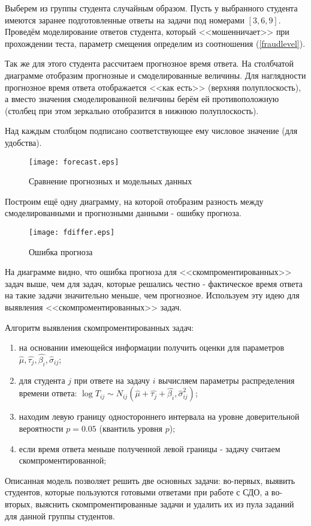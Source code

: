 Выберем из группы студента случайным образом. Пусть у выбранного студента имеются заранее подготовленные ответы на задачи под номерами $[3,6,9]$. Проведём моделирование ответов студента, который <<мошенничает>> при прохождении теста, параметр смещения определим из соотношения (\ref{fraudlevel}).

Так же для этого студента рассчитаем прогнозное время ответа. На стол\-бчатой диаграмме отобразим прогнозные и смоделированные величины. Для наглядности прогнозное время ответа отображается <<как есть>> (верхняя по\-луплоскость), а вместо значения смоделированной величины берём ей про\-тивоположную (столбец при этом зеркально отобразится в нижнюю полуплос\-кость). 

\newpage
Над каж\-дым столбцом подписано соответствующее ему чи\-словое зна\-чение (для удобства).

\begin{figure}[ht!]
\centering \texttt{[image: forecast.eps]}
\caption{Сравнение прогнозных и модельных данных}
\end{figure}

\newpage
Построим ещё одну диаграмму, на которой отобразим разность между смоделированными и прогнозными данными - ошибку прогноза.

\begin{figure}[ht!]
\centering \texttt{[image: fdiffer.eps]}
\caption{Ошибка прогноза}
\end{figure}
На диаграмме видно, что ошибка прогноза для <<скомпроментированных>> задач выше, чем для задач, которые решались честно - фактическое время ответа на такие задачи значительно меньше, чем прогнозное. Используем эту идею для выяв\-ления <<скомпроментированных>> задач.

Алгоритм выявления скомпроментированных задач:
\begin{enumerate}
\item на основании имеющейся информации получить оценки для параметров $\hat{\mu}, \hat{\tau_j}, \hat{\beta_i}, \hat{\sigma}_{ij}$;
\item для студента $j$ при ответе на задачу $i$ вычисляем параметры распре\-деления времени ответа: $\log T_{ij}\sim N_{ij}(\hat{\mu}+\hat{\tau_j}+\hat{\beta_i}, \hat{\sigma}^{2}_{ij})$;
\item находим левую границу одностороннего интервала на уровне довери\-тельной вероятности $p=0.05$ (квантиль уровня $p$\cite{23.});
\item если время ответа меньше полученной левой границы - задачу считаем скомпроментированной;
\end{enumerate}

Описанная модель позволяет решить две основных задачи: во-первых, выявить студентов, которые пользуются готовыми ответами при работе с СДО, а во-вторых, выяснить скомпроментированные задачи и удалить их из пула заданий для данной группы студентов. 